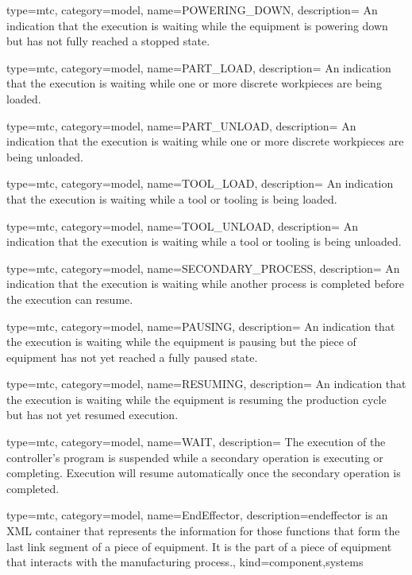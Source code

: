 {
  type=mtc,
  category=model,
  name={POWERING\_DOWN},
  description={ An indication that the execution is waiting while the equipment is powering down but has not fully reached a stopped state.}
}


{
  type=mtc,
  category=model,
  name={PART\_LOAD},
  description={ An indication that the execution is waiting while one or more discrete workpieces are being loaded.}
}


{
  type=mtc,
  category=model,
  name={PART\_UNLOAD},
  description={ An indication that the execution is waiting while one or more discrete workpieces are being unloaded.}
}


{
  type=mtc,
  category=model,
  name={TOOL\_LOAD},
  description={ An indication that the execution is waiting while a tool or tooling is being loaded.}
}


{
  type=mtc,
  category=model,
  name={TOOL\_UNLOAD},
  description={ An indication that the execution is waiting while a tool or tooling is being unloaded.}
}


{
  type=mtc,
  category=model,
  name={SECONDARY\_PROCESS},
  description={ An indication that the execution is waiting while another process is completed before the execution can resume.}
}


{
  type=mtc,
  category=model,
  name={PAUSING},
  description={ An indication that the execution is waiting while the equipment is pausing but the piece of equipment has not yet reached a fully paused state.}
}


{
  type=mtc,
  category=model,
  name={RESUMING},
  description={ An indication that the execution is waiting while the equipment is resuming the production cycle but has not yet resumed execution.}
}


{
  type=mtc,
  category=model,
  name={WAIT},
  description={  The execution of the controller's program is suspended while a secondary operation is executing or completing.  Execution will resume automatically once the secondary operation is completed.}
}

{
  type=mtc,
  category=model,
  name={EndEffector},
  description={\gls{endeffector} is an XML container that represents the information for those functions that form the last link segment of a piece of equipment. It is the part of a piece of equipment that interacts with the manufacturing process.},
  kind={component,systems}
}


